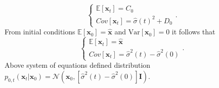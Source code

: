 \documentclass[10pt]{article}
\begin{document}
\begin{equation}
    \begin{cases}
      \mathbb{E}[\textbf{x}_t]  = C_0\\
       Cov[\textbf{x}_t] =   \hat{\sigma}(t)^2 + D_0
    \end{cases}.
\end{equation}
From initial conditions   $\mathbb{E}[\textbf{x}_0] =  \hat{\textbf{x} }$ and $\text{Var}[\textbf{x}_0] = 0$ it follows that
\begin{equation}
    \begin{cases}
\mathbb{E}[\textbf{x}_t] = \hat{\textbf{x} } \\
Cov[\textbf{x}_t] = \hat{\sigma}^2(t) -\hat{\sigma}^2(0) 
    \end{cases}.
\end{equation}
Above system of equations defined distribution $p_{0,t}(\textbf{x}_t |\textbf{x}_0 ) = \mathcal{N}(\textbf{x}_0, [\hat{\sigma}^2(t) -\hat{\sigma}^2(0) ]\mathbf{I})$.
\end{document}
